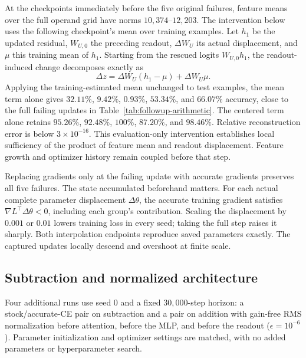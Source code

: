 At the checkpoints immediately before the five original failures, feature means over the full operand grid have norms $10{,}374$--$12{,}203$. The intervention below uses the following checkpoint's mean over training examples. Let $h_1$ be the updated residual, $W_{U,0}$ the preceding readout, $\Delta W_U$ its actual displacement, and $\mu$ this training mean of $h_1$. Starting from the rescued logits $W_{U,0}h_1$, the readout-induced change decomposes exactly as
\begin{equation}
\Delta z=\Delta W_U(h_1-\mu)+\Delta W_U\mu.
\label{eq:followup-mean}
\end{equation}
Applying the training-estimated mean unchanged to test examples, the mean term alone gives $32.11\%$, $9.42\%$, $0.93\%$, $53.34\%$, and $66.07\%$ accuracy, close to the full failing updates in Table~\ref{tab:followup-arithmetic}. The centered term alone retains $95.26\%$, $92.48\%$, $100\%$, $87.20\%$, and $98.46\%$. Relative reconstruction error is below $3\times10^{-16}$. This evaluation-only intervention establishes local sufficiency of the product of feature mean and readout displacement. Feature growth and optimizer history remain coupled before that step.

Replacing gradients only at the failing update with accurate gradients preserves all five failures. The state accumulated beforehand matters. For each actual complete parameter displacement $\Delta\theta$, the accurate training gradient satisfies $\nabla L^{\top}\Delta\theta<0$, including each group's contribution. Scaling the displacement by $0.001$ or $0.01$ lowers training loss in every seed; taking the full step raises it sharply. Both interpolation endpoints reproduce saved parameters exactly. The captured updates locally descend and overshoot at finite scale.

\subsection{Subtraction and normalized architecture}
\label{app:normalized}

Four additional runs use seed $0$ and a fixed $30{,}000$-step horizon: a stock/accurate-CE pair on subtraction and a pair on addition with gain-free RMS normalization before attention, before the MLP, and before the readout ($\epsilon=10^{-6}$). Parameter initialization and optimizer settings are matched, with no added parameters or hyperparameter search.

